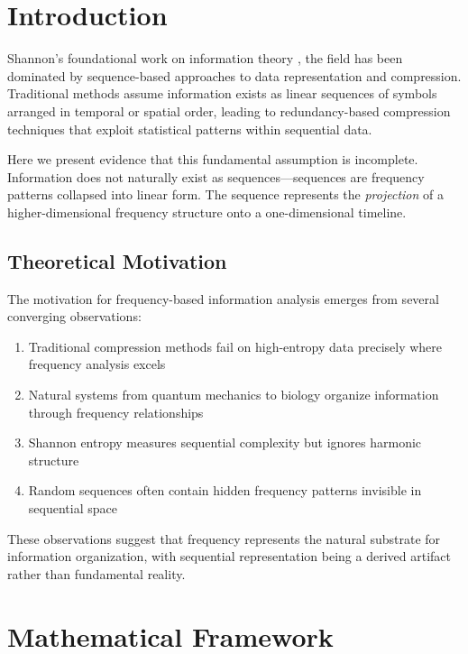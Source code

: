 \documentclass[journal]{IEEEtran}
\begin{document}
\section{Introduction}

 Shannon's foundational work on information theory \cite{shannon1948}, the field has been dominated by sequence-based approaches to data representation and compression. Traditional methods assume information exists as linear sequences of symbols arranged in temporal or spatial order, leading to redundancy-based compression techniques that exploit statistical patterns within sequential data.

Here we present evidence that this fundamental assumption is incomplete. Information does not naturally exist as sequences—sequences are frequency patterns collapsed into linear form. The sequence represents the \emph{projection} of a higher-dimensional frequency structure onto a one-dimensional timeline.

\subsection{Theoretical Motivation}

The motivation for frequency-based information analysis emerges from several converging observations:

\begin{enumerate}
    \item Traditional compression methods fail on high-entropy data precisely where frequency analysis excels
    \item Natural systems from quantum mechanics to biology organize information through frequency relationships
    \item Shannon entropy measures sequential complexity but ignores harmonic structure
    \item Random sequences often contain hidden frequency patterns invisible in sequential space
\end{enumerate}

These observations suggest that frequency represents the natural substrate for information organization, with sequential representation being a derived artifact rather than fundamental reality.

\section{Mathematical Framework}
\end{document}
